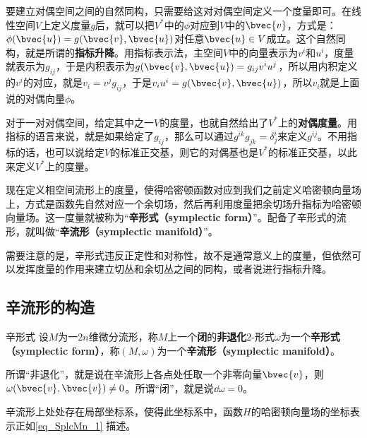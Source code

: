 要建立对偶空间之间的自然同构，只需要给这对对偶空间定义一个度量即可。在线性空间$V$上定义度量$g$后，就可以把$V^*$中的$\phi$对应到$V$中的$\bvec{v}$，方式是：$\phi(\bvec{u})=g(\bvec{v}, \bvec{u})$对任意$\bvec{u}\in V$成立。这个自然同构，就是所谓的\textbf{指标升降}。用指标表示法，主空间$V$中的向量表示为$v^i$和$u^i$，度量就表示为$g_{ij}$，于是内积表示为$g(\bvec{v}, \bvec{u})=g_{ij}v^iu^j$，所以用内积定义的$v^i$的对应，就是$v_i=v^jg_{ij}$，于是$v_iu^i=g(\bvec{v}, \bvec{u})$，所以$v_i$就是上面说的对偶向量$\phi$。

对于一对对偶空间，给定其中之一$V$的度量，也就自然给出了$V^*$上的\textbf{对偶度量}。用指标的语言来说，就是如果给定了$g_{ij}$，那么可以通过$g^{ik}g_{jk}=\delta^i_j$来定义$g^{ij}$。不用指标的话，也可以说给定$V$的标准正交基，则它的对偶基也是$V^*$的标准正交基，以此来定义$V^*$上的度量。

现在定义相空间流形上的度量，使得哈密顿函数对应到我们之前定义哈密顿向量场上，方式是函数先自然对应一个余切场，然后再利用度量把余切场升指标为哈密顿向量场。这一度量就被称为“\textbf{辛形式（symplectic form）}”。配备了辛形式的流形，就叫做“\textbf{辛流形（symplectic manifold）}”。

需要注意的是，辛形式违反正定性和对称性，故不是通常意义上的度量，但依然可以发挥度量的作用来建立切丛和余切丛之间的同构，或者说进行指标升降。


\subsection{辛流形的构造}




\begin{definition}{辛形式}
设$M$为一$2n$维微分流形，称$M$上一个\textbf{闭}的\textbf{非退化}$2$-形式$\omega$为一个\textbf{辛形式（symplectic form）}，称$(M, \omega)$为一个\textbf{辛流形（symplectic manifold）}。
\end{definition}

所谓“非退化”，就是说在辛流形上各点处任取一个非零向量$\bvec{v}$，则$\omega(\bvec{v}, \bvec{v})\neq 0$。所谓“闭”，就是说$\dd \omega =0$。

辛流形上处处存在局部坐标系，使得此坐标系中，函数$H$的哈密顿向量场的坐标表示正如\autoref{eq_SplcMn_1} 描述。
























